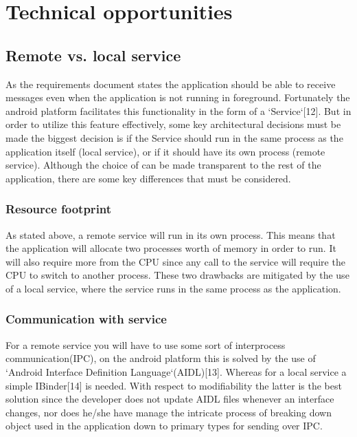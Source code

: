 

\section{Technical opportunities}

\subsection{Remote vs. local service}

As the requirements document states the application should be able to receive messages even when the application is not running in foreground. Fortunately the android platform facilitates this functionality in the form of a `Service`[12]. But in order to utilize this feature effectively, some key architectural decisions must be made the biggest decision is if the Service should run in the same process as the application itself (local service), or if it should have its own process (remote service). Although the choice of can be made transparent to the rest of the application, there are some key differences that must be considered.

\subsubsection{Resource footprint}
As stated above, a remote service will run in its own process. This means that the application will allocate two processes worth of memory in order to run. It will also require more from the CPU since any call to the service will require the CPU to switch to another process. These two drawbacks are mitigated by the use of a local service, where the service runs in the same process as the application. 

\subsubsection{Communication with service}
For a remote service you will have to use some sort of  interprocess communication(IPC), on the android platform this is solved by the use of `Android Interface Definition Language`(AIDL)[13]. Whereas for a local service a simple IBinder[14] is needed. With respect to modifiability the latter is the best solution since the developer does not update AIDL files whenever an interface changes, nor does he/she have manage the intricate process of breaking down object used in the application down to primary types for sending over IPC. 



